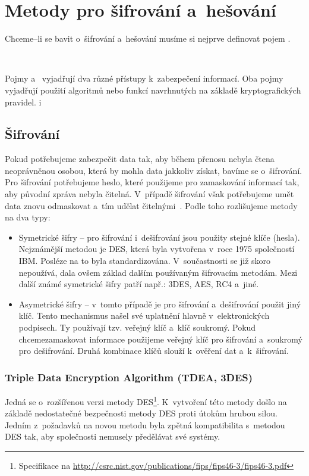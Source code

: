 \chapter{Metody pro šifrování a~hešování}
\label{ch:sifrovani}
Chceme--li se bavit o~šifrování a~hešování musíme si nejprve definovat pojem .
\begin{defn}
    ~\cite{AC:1996} 
\end{defn}
Pojmy  a~ vyjadřují dva různé přístupy k~zabezpečení informací. Oba pojmy
vyjadřují použití algoritmů nebo funkcí navrhnutých na základě kryptografických pravidel. 
i
\section{Šifrování}
Pokud potřebujeme zabezpečit data tak, aby během přenosu nebyla čtena neoprávněnou osobou, která by
mohla data jakkoliv získat, bavíme se o~šifrování. Pro šifrování potřebujeme heslo, které použijeme
pro zamaskování informací tak, aby původní zpráva nebyla čitelná. V~případě šifrování však
potřebujeme umět data znovu odmaskovat a~tím udělat čitelnými~\cite{AC:1996}. Podle toho rozlišujeme metody na dva
typy:
\begin{itemize}
    \item Symetrické šifry -- pro šifrování i~dešifrování jsou použity stejné klíče (hesla).
        Nejznámější metodou je DES, která byla vytvořena v~roce 1975 společností IBM. Posléze na to
        byla standardizována. V~součastnosti se již skoro nepoužívá, dala ovšem základ dalším
        používaným šifrovacím metodám. Mezi další známé symetrické šifry patří např.: 3DES, AES, RC4
        a~jiné.
    \item Asymetrické šifry -- v~tomto případě je pro šifrování a~dešifrování použit jiný klíč.
        Tento mechanismus našel své uplatnění hlavně v~elektronických podpisech. Ty používají tzv.
        veřejný klíč a~klíč soukromý. Pokud chcemezamaskovat informace použijeme veřejný klíč pro
        šifrování a~soukromý pro dešifrování. Druhá kombinace klíčů slouží k~ověření dat a~k~šifrování.
\end{itemize}

\subsection{Triple Data Encryption Algorithm (TDEA, 3DES)}
Jedná se o~rozšířenou verzi metody
DES\footnote{Specifikace na \url{http://csrc.nist.gov/publications/fips/fips46-3/fips46-3.pdf}}.
K~vytvoření této metody došlo na základě nedostatečné bezpečnosti metody DES proti útokům hrubou
silou. Jedním z~požadavků na novou metodu byla zpětná kompatibilita s~metodou DES tak, aby
společnosti nemusely předělávat své systémy.

